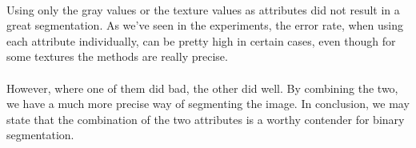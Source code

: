 \paragraph{}
Using only the gray values or the texture values as attributes did not result in a great segmentation.
As we've seen in the experiments, the error rate, when using each attribute individually, can be pretty high in certain cases, even though for some textures the methods are really precise.
\paragraph{}
However, where one of them did bad, the other did well. By combining the two, we have a much more precise way of segmenting the image.
In conclusion, we may state that the combination of the two attributes is a worthy contender for binary segmentation. 
